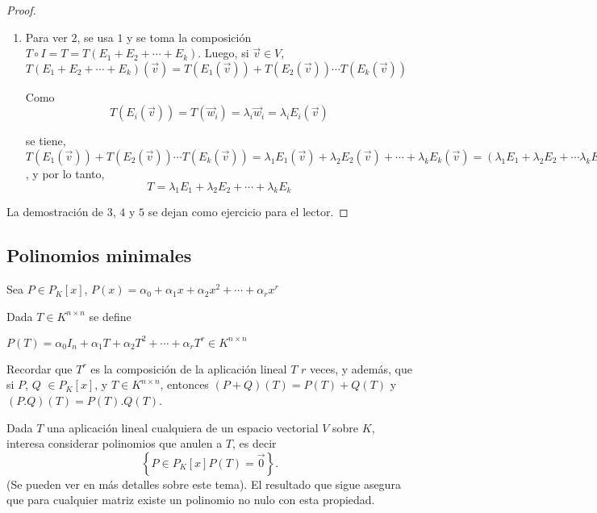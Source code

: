 \begin{theorem}
\begin{proof}
\begin{enumerate}
\item
Para ver $2$, se usa $1$ y se toma la composición $ T \circ  I = T= T(E_1+ E_2 +  \cdots +  E_k)$. Luego, si $ \Vec{v}  \in V$, $   T(E_1+ E_2 +  \cdots +  E_k)(\Vec{v})= T(E_1(\Vec{v})) +  T(E_2(\Vec{v}))  \cdots T(E_k(\Vec{v}))$

Como $$T(E_i(\Vec{v}))= T(\Vec{w}_i)= \lambda_i \Vec{w}_i=  \lambda_i E_i(\Vec{v})$$

\bigskip

se tiene, $T(E_1(\Vec{v})) +  T(E_2(\Vec{v}))  \cdots T(E_k(\Vec{v}))= \lambda_1 E_1(\Vec{v})  +  \lambda_2 E_2(\Vec{v})  + \cdots + \lambda_k E_k(\Vec{v})  = (\lambda_1 E_1  +  \lambda_2 E_2  + \cdots \lambda_k E_k)(\Vec{v})  $, y por lo tanto, 
 $$    T=  \lambda_1 E_1  +  \lambda_2 E_2  + \cdots  + \lambda_k E_k$$
\end{enumerate}


La demostración de $3$, $4$ y $5$ se dejan como ejercicio para el lector.


\end{proof}
\end{theorem}



\bigskip 

\subsection{Polinomios minimales}
\label{Polmin}

Sea $P\in P_K\left[x\right]$, 
 $P(x)=\alpha_0+\alpha_1x+\alpha_2x^2+\cdots+\alpha_{r}x^{r}$

\bigskip 

Dada $T  \in K^{n \times n}$ se define 

\bigskip 
$P(T)=\alpha_0I_n+\alpha_1T+\alpha_2T^2+\cdots+\alpha_{r}T^{r} \in K^{n \times n}  $

\bigskip 

Recordar que $T^{r}$ es la composición de la aplicación lineal $T$ $r$ veces, y  además, que si $P$, $Q$ $\in P_K\left[x\right]$, y $T  \in K^{n \times n}$, entonces $(P+Q)(T)= P(T)+Q(T)$  y $(P.Q)(T)= P(T).Q(T)$.


\bigskip 


Dada $T$ una aplicación lineal cualquiera de un espacio vectorial $V$ sobre $K$, interesa considerar polinomios que anulen a $T$, es decir $$\left\{ P\in P_K\left[x\right] P(T)=\vec{0}\right\}.$$ (Se pueden ver en  \cite{hoffman} más detalles sobre este tema). El  resultado  que sigue asegura que para cualquier matriz existe un polinomio no nulo con esta propiedad. 


